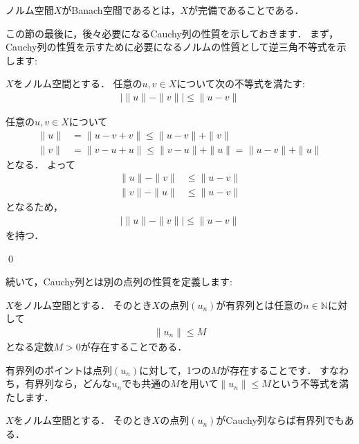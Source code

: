 \begin{defi}[Banach空間]\label{def:App:Banach}
ノルム空間$X$がBanach空間であるとは，$X$が完備であることである．
\end{defi}

この節の最後に，後々必要になるCauchy列の性質を示しておきます．
まず，Cauchy列の性質を示すために必要になるノルムの性質として逆三角不等式を示します:

\begin{Thm}[逆三角不等式]\label{thm:inv_triangle_inq}
$X$をノルム空間とする．
任意の$u, v \in X$について次の不等式を満たす:
\begin{align*}
| \| u \| - \| v \| | \le \| u - v \|
\end{align*}
\end{Thm}

\begin{Proof}
任意の$u, v \in X$について
\begin{align*}
 \| u \| &= \| u - v + v \| \le \| u - v \| + \| v \| \\
 \| v \| &= \| v - u + u \| \le \| v - u \| + \| u \| = \| u - v \| + \| u \| 
\end{align*}
となる．
よって
\begin{align*}
 \| u \| - \| v \| &\le \| u - v \| \\
 \| v \| - \| u \|  &\le  \| u - v \| 
\end{align*}
となるため，
\begin{align*}
| \| u \| - \| v \| | \le \| u - v \|
\end{align*}
を持つ．

\qed
\end{Proof}

続いて，Cauchy列とは別の点列の性質を定義します:

\begin{defi}[有界列]\label{def:bounded_seq}
$X$をノルム空間とする．
そのとき$X$の点列$(u_n)$が有界列とは任意の$n \in {\mathbb N}$に対して
\begin{align*}
\| u_n \| \le M
\end{align*}
となる定数$M > 0$が存在することである．
\end{defi}

有界列のポイントは点列$(u_n)$に対して，1つの$M$が存在することです．
すなわち，有界列なら，どんな$u_n$でも共通の$M$を用いて$\| u_n \| \le M$という不等式を満たします．

\begin{Thm}[Cauchy列ならば有界列]\label{def:if_cauchy_then_bounded}
$X$をノルム空間とする．
そのとき$X$の点列$(u_n)$がCauchy列ならば有界列でもある．
\end{Thm}

